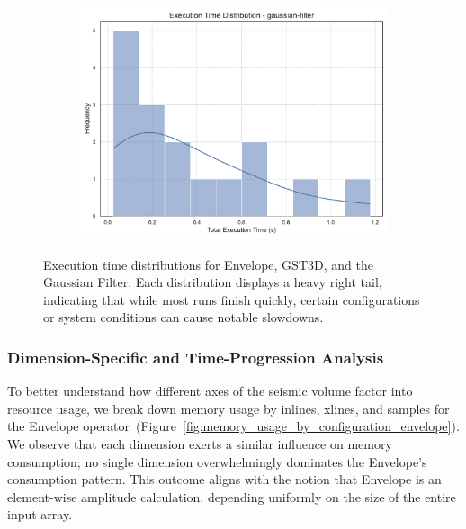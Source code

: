 \begin{figure}[htbp]
\begin{subfigure}[t]{0.49\textwidth}
        \includegraphics[width=\textwidth]{assets/images/05/execution_time_distribution_gaussian-filter}
    \end{subfigure}
    \caption{Execution time distributions for Envelope, \ac{GST3D}, and the Gaussian Filter. Each distribution displays a heavy right tail, indicating that while most runs finish quickly, certain configurations or system conditions can cause notable slowdowns.}
    \label{fig:execution_time_distribution_facet}
\end{figure}

\subsubsection{Dimension-Specific and Time-Progression Analysis}
\label{subsec:dimension-specific-and-time-progression-analysis}


To better understand how different axes of the seismic volume factor into resource usage, we break down memory usage by inlines, xlines, and samples for the Envelope operator~(Figure~\ref{fig:memory_usage_by_configuration_envelope}).
We observe that each dimension exerts a similar influence on memory consumption; no single dimension overwhelmingly dominates the Envelope’s consumption pattern.
This outcome aligns with the notion that Envelope is an element-wise amplitude calculation, depending uniformly on the size of the entire input array.


